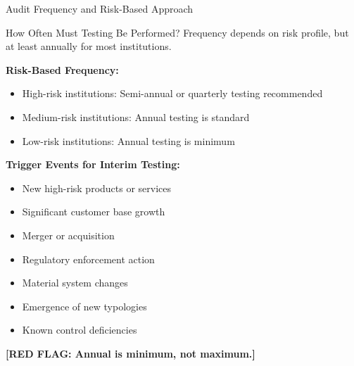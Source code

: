 \documentclass[11pt,a4paper]{beamer}
\newcommand{\redflag}[1]{\textcolor{red!80!black}{\textbf{[RED FLAG: #1]}}}
\begin{document}
	\begin{frame}{Audit Frequency and Risk-Based Approach}
		\begin{block}{How Often Must Testing Be Performed?}
			Frequency depends on risk profile, but at least annually for most institutions.
		\end{block}
		\textbf{Risk-Based Frequency:}
		\begin{itemize}
			\item High-risk institutions: Semi-annual or quarterly testing recommended
			\item Medium-risk institutions: Annual testing is standard
			\item Low-risk institutions: Annual testing is minimum
		\end{itemize}
		\textbf{Trigger Events for Interim Testing:}
		\begin{itemize}
			\item New high-risk products or services
			\item Significant customer base growth
			\item Merger or acquisition
			\item Regulatory enforcement action
			\item Material system changes
			\item Emergence of new typologies
			\item Known control deficiencies
		\end{itemize}
		\redflag{Annual is minimum, not maximum.}
	\end{frame}
	
	
\end{document}
